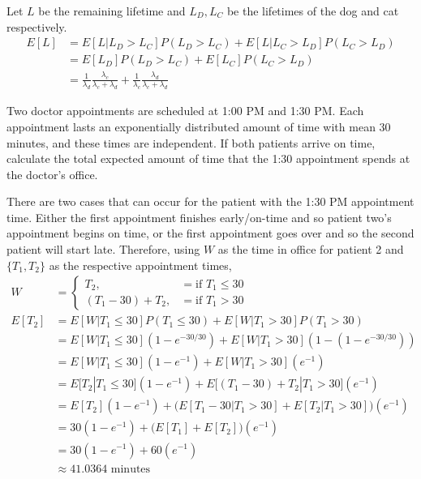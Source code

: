 \documentclass[10pt,a4paper]{exam}
\begin{document}
\begin{questions}
\begin{solution}
Let $L$ be the remaining lifetime and $L_D, L_C$ be the lifetimes of the dog and cat respectively.
\begin{align*}
E[L]		&= E[L|L_D > L_C]P(L_D > L_C) + E[L|L_C > L_D]P(L_C > L_D)\\
			&= E[L_D]P(L_D > L_C) + E[L_C]P(L_C > L_D)\\
			&= \frac{1}{\lambda_d}\frac{\lambda_c}{\lambda_c + \lambda_d} + \frac{1}{\lambda_c}\frac{\lambda_d}{\lambda_c + \lambda_d}
\end{align*}
\end{solution}

\question Two doctor appointments are scheduled at 1:00 PM and 1:30 PM. Each appointment lasts an exponentially distributed amount of time with mean 30 minutes, and these times are independent. If both patients arrive on time, calculate the total expected amount of time that the 1:30 appointment spends at the doctor's office.

\begin{solution}
There are two cases that can occur for the patient with the 1:30 PM appointment time. Either the first appointment finishes early/on-time and so patient two's appointment begins on time, or the first appointment goes over and so the second patient will start late. Therefore, using $W$ as the time in office for patient 2 and $\{T_1, T_2\}$ as the respective appointment times,
\begin{align*}
W 	&= 	\begin{cases}
					T_2, &= \text{if }T_1 \leq 30\\
					(T_1 - 30) + T_2, &= \text{if }T_1 > 30
				\end{cases}\\
E[T_2] 	&= E[W | T_1 \leq 30]P(T_1 \leq 30) + E[W | T_1 > 30]P(T_1 > 30)\\
			&= E[W | T_1 \leq 30]\left(1 - e^{-30/30}\right) + E[W| T_1 > 30]\left(1 - (1 - e^{-30/30})\right)\\
			&= E[W | T_1 \leq 30]\left(1 - e^{-1}\right) + E[W | T_1 > 30]\left(e^{-1}\right)\\
			&= E[T_2 | T_1 \leq 30]\left(1 - e^{-1}\right) + E\Big[(T_1 - 30) + T_2 | T_1 > 30\Big]\left(e^{-1}\right)\\
			&= E[T_2]\left(1 - e^{-1}\right) + \Big(E[T_1 - 30|T_1 > 30] + E[T_2|T_1 > 30]\Big)\left(e^{-1}\right)\\
			&=  30\left(1 - e^{-1}\right) +  \Big(E[T_1] + E[T_2]\Big)\left(e^{-1}\right)\\
			&= 30\left(1 - e^{-1}\right) +  60\left(e^{-1}\right)\\
			&\approx 41.0364\text{ minutes}
\end{align*}



\end{solution}
\end{questions}
\end{document}
